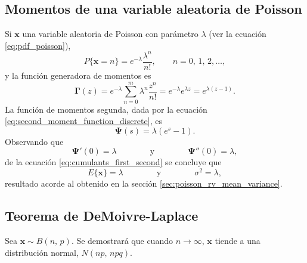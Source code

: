 \documentclass[a4paper]{report}
\newcommand{\x}{\mathbf{x}}
\newcommand{\Psibf}{\mathbf{\Psi}}
\newcommand{\Gammabf}{\mathbf{\Gamma}}
\begin{document}
\subsection{Momentos de una variable aleatoria de Poisson}

Si \(\x\) una variable aleatoria de Poisson con parámetro \(\lambda\) (ver la ecuación \ref{eq:pdf_poisson}),
\[
 P\{\x=n\}=e^{-\lambda}\frac{\lambda^n}{n!},\qquad n=0,\,1,\,2,\dots,
\]
y la función generadora de momentos es
\begin{equation}\label{eq:poisson_moment_generating_function}
 \Gammabf(z)=e^{-\lambda}\sum_{n=0}^{m}\lambda^n\frac{z^{n}}{n!}=e^{-\lambda}e^{\lambda z}=e^{\lambda(z-1)}.
\end{equation}
La función de momentos segunda, dada por la ecuación \ref{eq:second_moment_function_discrete}, es
\begin{equation}\label{eq:poisson_second_moment_function}
 \Psibf(s)=\lambda(e^s-1).
\end{equation}
Observando que 
\[
 \Psibf'(0)=\lambda
  \qquad\qquad\textrm{y}\qquad\qquad
 \Psibf''(0)=\lambda, 
\]
de la ecuación \ref{eq:cumulants_first_second} se concluye que 
\[
 E\{\x\}=\lambda
  \qquad\qquad\textrm{y}\qquad\qquad
 \sigma^2=\lambda, 
\]
resultado acorde al obtenido en la sección \ref{sec:poisson_rv_mean_variance}.

\subsection{Teorema de DeMoivre-Laplace}\label{sec:demoivre_laplace_theorem}

Sea \(\x\sim B(n,\,p)\). Se demostrará que cuando \(n\to\infty\), \(\x\) tiende a una distribución normal, \(N(np,\,npq)\).
\end{document}
